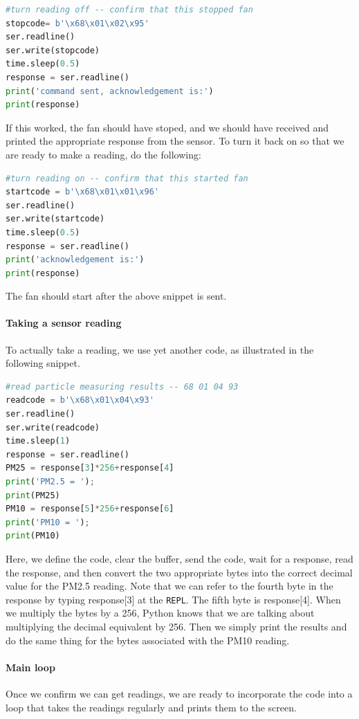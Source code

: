 \begin{lstlisting}[language=Python]
#turn reading off -- confirm that this stopped fan
stopcode= b'\x68\x01\x02\x95'
ser.readline()
ser.write(stopcode)
time.sleep(0.5)
response = ser.readline()
print('command sent, acknowledgement is:')
print(response)
\end{lstlisting}

If this worked, the fan should have stoped, and we should have received and printed the appropriate response from the sensor.
To turn it back on so that we are ready to make a reading, do the following:

\begin{lstlisting}[language=Python]
#turn reading on -- confirm that this started fan
startcode = b'\x68\x01\x01\x96'
ser.readline()
ser.write(startcode)
time.sleep(0.5)
response = ser.readline()
print('acknowledgement is:')
print(response)

\end{lstlisting}

The fan should start after the above snippet is sent.

\paragraph{Taking a sensor reading}
To actually take a reading, we use yet another code, as illustrated in the following snippet.

\begin{lstlisting}[language=Python]
#read particle measuring results -- 68 01 04 93
readcode = b'\x68\x01\x04\x93'
ser.readline()
ser.write(readcode)
time.sleep(1)
response = ser.readline()
PM25 = response[3]*256+response[4]
print('PM2.5 = ');
print(PM25)
PM10 = response[5]*256+response[6]
print('PM10 = ');
print(PM10)
\end{lstlisting}

Here, we define the code, clear the \uart buffer, send the code, wait for a response, read the response, and then convert the two appropriate bytes into the correct decimal value for the PM2.5 reading.
Note that we can refer to the fourth byte in the response by typing response[3] at the \texttt{REPL}.
The fifth byte is response[4].  When we multiply the bytes by a 256, Python knows that we are talking about multiplying the decimal equivalent by 256.
Then we simply print the results and do the same thing for the bytes associated with the PM10 reading.

\paragraph{Main loop}
Once we confirm we can get readings, we are ready to incorporate the code into a loop that takes the readings regularly and prints them to the screen.

